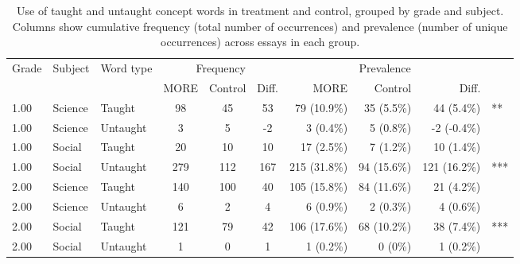 \begin{table}[ht]
\centering
\caption{Use of taught and untaught concept words in treatment and control,
                    grouped by grade and subject. Columns show cumulative frequency (total number of occurrences) and prevalence
                    (number of unique occurrences) across essays in each group.} 
\label{tab:cwords}
\begin{tabular}{lllcccrrrl}
  \hline
 \multirow{2}{*}{Grade} & \multirow{2}{*}{Subject} & \multirow{2}{*}{Word type} & \multicolumn{3}{c}{Frequency}
                      & \multicolumn{3}{c}{Prevalence}\\ \cline{4-6}\cline{7-9}
 &  &  & MORE & Control & Diff. & MORE & Control & Diff. &  \\ 
  \hline
1.00 & Science & Taught &  98 &  45 &  53 & 79 (10.9\%) & 35 (5.5\%) & 44 (5.4\%) & ** \\ 
  1.00 & Science & Untaught &   3 &   5 &  -2 & 3 (0.4\%) & 5 (0.8\%) & -2 (-0.4\%) &  \\ 
  1.00 & Social & Taught &  20 &  10 &  10 & 17 (2.5\%) & 7 (1.2\%) & 10 (1.4\%) &  \\ 
  1.00 & Social & Untaught & 279 & 112 & 167 & 215 (31.8\%) & 94 (15.6\%) & 121 (16.2\%) & *** \\ 
  2.00 & Science & Taught & 140 & 100 &  40 & 105 (15.8\%) & 84 (11.6\%) & 21 (4.2\%) &  \\ 
  2.00 & Science & Untaught &   6 &   2 &   4 & 6 (0.9\%) & 2 (0.3\%) & 4 (0.6\%) &  \\ 
  2.00 & Social & Taught & 121 &  79 &  42 & 106 (17.6\%) & 68 (10.2\%) & 38 (7.4\%) & *** \\ 
  2.00 & Social & Untaught &   1 &   0 &   1 & 1 (0.2\%) & 0 (0\%) & 1 (0.2\%) &  \\ 
   \hline
\end{tabular}
\end{table}
